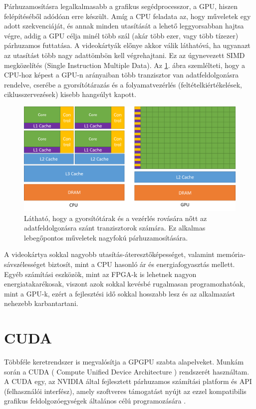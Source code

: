 Párhuzamosításra legalkalmasabb a grafikus segédprocesszor, a GPU, hiszen felépítéséből adódóan erre készült. Amíg a CPU feladata az, hogy műveletek egy adott szekvenciáját, és annak minden utasítását a lehető leggyorsabban hajtsa végre, addig a GPU célja minél több szál (akár több ezer, vagy több tízezer) párhuzamos futtatása. A videokártyák előnye akkor válik láthatóvá, ha ugyanazt az utasítást több nagy adattömbön kell végrehajtani. Ez az úgynevezett SIMD megközelítés (Single Instruction Multiple Data). \cite{kvantum_optim}
Az \ref{TransistorsInGpu}. ábra szemlélteti, hogy a CPU-hoz képest a GPU-n arányaiban több tranzisztor van adatfeldolgozásra rendelve, cserébe a gyorsítótárazás és a folyamatvezérlés (feltételkiértékelések, ciklusszervezések) kisebb hangsúlyt kapott.

\begin{figure}[ht!]
	\centering
	\includegraphics[width=150mm, keepaspectratio] {figures/gpu-devotes-more-transistors-to-data-processing.png}
	\caption{Látható, hogy a gyorsítótárak és a vezérlés rovására nőtt az adatfeldolgozásra szánt tranzisztorok számára. Ez alkalmas lebegőpontos műveletek nagyfokú párhuzamosítására. \cite{CUDAdoc} \label{TransistorsInGpu} }
\end{figure}


A videokártya sokkal nagyobb utasítás-áteresztőképességet, valamint memória-sávszélességet biztosít, mint a CPU hasonló ár és energiafogyasztás mellett. Egyéb számítási eszközök, mint az FPGA-k is lehetnek nagyon energiatakarékosak, viszont azok sokkal kevésbé rugalmasan programozhatóak, mint a GPU-k, ezért a fejlesztési idő sokkal hosszabb lesz és az alkalmazást nehezebb karbantartani. \cite{CUDAdoc}

\section{CUDA}
Többféle keretrendszer is megvalósítja a GPGPU szabta alapelveket. Munkám során a CUDA ( Compute Unified Device Architecture ) rendszerét használtam. A CUDA egy, az NVIDIA által fejlesztett párhuzamos számítási platform és API (felhasználói interfész), amely szoftveres támogatást nyújt az ezzel kompatibilis grafikus feldolgozóegységek általános célú programozására \cite{kvantum_optim}. 

